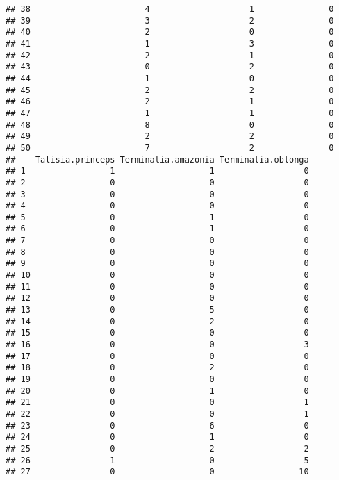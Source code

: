 \documentclass[
]{article}
\begin{document}
\begin{verbatim}
## 38                       4                    1               0
## 39                       3                    2               0
## 40                       2                    0               0
## 41                       1                    3               0
## 42                       2                    1               0
## 43                       0                    2               0
## 44                       1                    0               0
## 45                       2                    2               0
## 46                       2                    1               0
## 47                       1                    1               0
## 48                       8                    0               0
## 49                       2                    2               0
## 50                       7                    2               0
##    Talisia.princeps Terminalia.amazonia Terminalia.oblonga
## 1                 1                   1                  0
## 2                 0                   0                  0
## 3                 0                   0                  0
## 4                 0                   0                  0
## 5                 0                   1                  0
## 6                 0                   1                  0
## 7                 0                   0                  0
## 8                 0                   0                  0
## 9                 0                   0                  0
## 10                0                   0                  0
## 11                0                   0                  0
## 12                0                   0                  0
## 13                0                   5                  0
## 14                0                   2                  0
## 15                0                   0                  0
## 16                0                   0                  3
## 17                0                   0                  0
## 18                0                   2                  0
## 19                0                   0                  0
## 20                0                   1                  0
## 21                0                   0                  1
## 22                0                   0                  1
## 23                0                   6                  0
## 24                0                   1                  0
## 25                0                   2                  2
## 26                1                   0                  5
## 27                0                   0                 10

\end{verbatim}
\end{document}
